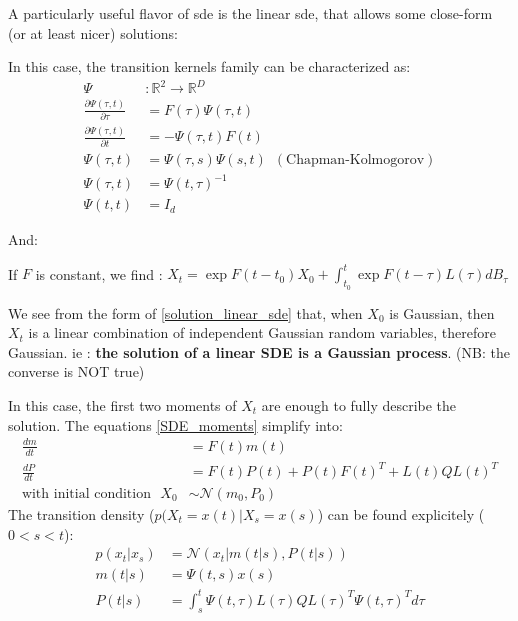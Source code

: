 A particularly useful flavor of \gls{sde} is the linear \gls{sde}, that allows some close-form (or at least nicer) solutions:


In this case, the transition kernels family can be characterized as:
\begin{align}
    \Psi &: \mathbb{R}^{2 } \rightarrow \mathbb{R}^{D} \\
    \frac{\partial \Psi (\tau, t)}{\partial \tau} &= F(\tau) \Psi(\tau, t) \\
    \frac{\partial \Psi (\tau, t)}{\partial t} &= - \Psi(\tau, t) F(t)  \\
    \Psi(\tau, t) &= \Psi(\tau, s) \Psi(s, t) \,\,\, (\text{Chapman-Kolmogorov}) \\
    \Psi(\tau, t) &= \Psi(t, \tau)^{-1} \\ 
    \Psi(t,t) &= I_d
\end{align}

And:

If $F$ is constant, we find : $X_t = \exp{F(t-t_0)}X_0 + \int_{t_0}^{t} \exp{F(t- \tau)}L(\tau)dB_{\tau}$

We see from the form of \ref{solution_linear_sde} that, when $X_0$ is Gaussian, then $X_t$ is a linear combination of 
independent Gaussian random variables, therefore Gaussian. ie : \textbf{the solution of a linear SDE is a Gaussian process}. 
(NB: the converse is NOT true)

In this case, the first two moments of $X_t$ are enough to fully describe the solution. The equations \ref{SDE_moments} simplify into:
\begin{align}
    \label{SDE_linear_moments}
    \frac{dm}{dt} &= F(t) m(t) \\
    \frac{dP}{dt} &= F(t)P(t) + P(t)F(t)^{T} + L(t)QL(t)^{T} \\
    \text{with initial condition } \,\, X_0 &\sim \mathcal{N}(m_0, P_0)
\end{align}
The transition density ($p(X_t = x(t) \vert X_s = x(s)$) can be found explicitely ($0 < s < t$):
\begin{align}
    p(x_t \vert x_s) &= \mathcal{N}(x_t \vert m(t\vert s), P(t \vert s)) \\
    m(t \vert s) &= \Psi(t,s)x(s) \\
    P(t \vert s) &= \int_{s}^{t} \Psi(t,\tau)L(\tau)Q L(\tau)^{T}\Psi(t, \tau)^{T} d\tau
\end{align}

